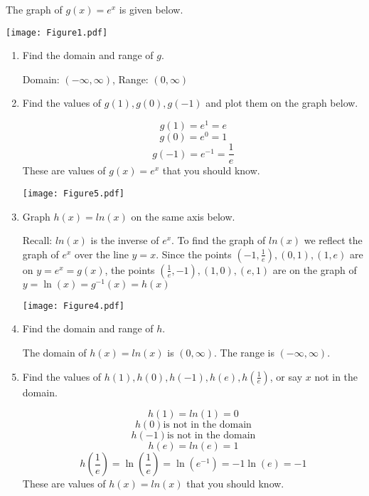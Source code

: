 \documentclass[nooutcomes, noinstructornotes]{ximera}
\begin{document}
\begin{problem}
The graph of $g(x)=e^x$ is given below.

	\begin{image}		
	\texttt{[image: Figure1.pdf]}
	\end{image}

\begin{enumerate}	
	\item  Find the domain and range of $g$.
		\begin{freeResponse}
		Domain: $(-\infty,\infty)$, Range: $(0,\infty)$
		\end{freeResponse}


	
	\item  Find the values of $g(1), g(0), g(-1)$ and plot them on the graph below.
		\begin{freeResponse}
	
			$$g(1)=e^1=e$$
			$$ g(0)=e^0=1$$ 
			$$g(-1)=e^{-1}=\frac{1}{e}$$
			 These are values of $g(x)=e^x$ that you should know.

		\begin{image}		
		\texttt{[image: Figure5.pdf]}
		\end{image}


		\end{freeResponse}
	\item Graph $h(x)=ln(x)$ on the same axis below.
		\begin{freeResponse}
		Recall:  $ln(x)$ is the inverse of $e^x$.  To find the graph of $ln(x)$ we reflect the graph of $e^x$ over the line $y=x$.  Since the points $\left(-1,\frac{1}{e}\right),(0,1),(1,e)$ are on $y=e^x=g(x)$, the points $\left(\frac{1}{e}, -1\right),(1,0),(e,1)$ are on the graph of $y=\ln(x)=g^{-1}(x)=h(x)$ 

		\begin{image}		
		\texttt{[image: Figure4.pdf]}
		\end{image}
		\end{freeResponse}

	\item Find the domain and range of $h$.
		\begin{freeResponse}
		The domain of $h(x)=ln(x)$ is $(0,\infty)$.  The range is $(-\infty,\infty)$.
		\end{freeResponse}

	\item Find the values of $h(1), h(0), h(-1), h(e), h\left(\frac{1}{e}\right)$, or say $x$ not in the domain.
			\begin{freeResponse}
			 $$h(1)=ln(1)=0$$
			$$ h(0) \text{is not in the domain}$$
			$$ h(-1) \text{is not in the domain}$$
			$$h(e)=ln(e)=1$$
			$$h\left(\frac{1}{e}\right)=\ln\left(\frac{1}{e}\right)=\ln\left(e^{-1}\right)= -1\ln(e)=-1$$
			 These are values of $h(x)=ln(x)$ that you should know.
		\end{freeResponse}
	\end{enumerate}
	
 		
		
	
\end{problem}
\end{document}
